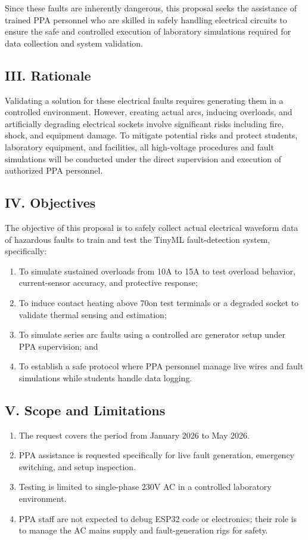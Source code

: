 Since these faults are inherently dangerous, this proposal seeks the assistance
of trained PPA personnel who are skilled in safely handling electrical circuits
to ensure the safe and controlled execution of laboratory simulations required
for data collection and system validation.

\subsection*{III. Rationale}

Validating a solution for these electrical faults requires generating them in a
controlled environment. However, creating actual arcs, inducing overloads, and
artificially degrading electrical sockets involve significant risks including
fire, shock, and equipment damage. To mitigate potential risks and protect
students, laboratory equipment, and facilities, all high-voltage procedures and
fault simulations will be conducted under the direct supervision and execution
of authorized PPA personnel.

\subsection*{IV. Objectives}

The objective of this proposal is to safely collect actual electrical waveform
data of hazardous faults to train and test the TinyML fault-detection system,
specifically:
\begin{enumerate}
\item To simulate sustained overloads from 10A to 15A to test overload
behavior, current-sensor accuracy, and protective response;
\item To induce contact heating above 70\degreeC on test terminals or a
degraded socket to validate thermal sensing and estimation;
\item To simulate series arc faults using a controlled arc generator setup
under PPA supervision; and
\item To establish a safe protocol where PPA personnel manage live wires and
fault simulations while students handle data logging.
\end{enumerate}

\subsection*{V. Scope and Limitations}

\begin{enumerate}
\item The request covers the period from January 2026 to May 2026.
\item PPA assistance is requested specifically for live fault generation,
emergency switching, and setup inspection.
\item Testing is limited to single-phase 230V AC in a controlled laboratory
environment.
\item PPA staff are not expected to debug ESP32 code or electronics; their role
is to manage the AC mains supply and fault-generation rigs for safety.
\end{enumerate}

